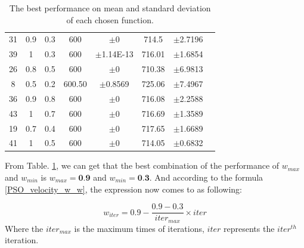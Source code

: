 \documentclass[letterpaper,12pt]{article}
\begin{document}
\begin{table}[!h]
\begin{tabular}{|c|c|c|c|c|c|c|c|c|}
31 & 0.9 & 0.3 & 600    & $\pm$0        & 714.5  & $\pm$2.7196 & \multicolumn{2}{c|}{}    \\ \cline{1-7}
39 & 1   & 0.3 & 600    & $\pm$1.14E-13 & 716.01 & $\pm$1.6854 & \multicolumn{2}{c|}{}    \\ \cline{1-7}
26 & 0.8 & 0.5 & 600    & $\pm$0        & 710.38 & $\pm$6.9813 & \multicolumn{2}{c|}{}    \\ \cline{1-7}
8  & 0.5 & 0.2 & 600.50 & $\pm$0.8569   & 725.06 & $\pm$7.4967 & \multicolumn{2}{c|}{}    \\ \cline{1-7}
36 & 0.9 & 0.8 & 600    & $\pm$0        & 716.08 & $\pm$2.2588 & \multicolumn{2}{c|}{}    \\ \cline{1-7}
43 & 1   & 0.7 & 600    & $\pm$0        & 716.69 & $\pm$1.3589 & \multicolumn{2}{c|}{}    \\ \cline{1-7}
19 & 0.7 & 0.4 & 600    & $\pm$0        & 717.65 & $\pm$1.6689 & \multicolumn{2}{c|}{}    \\ \cline{1-7}
41 & 1   & 0.5 & 600    & $\pm$0        & 714.05 & $\pm$0.6832 & \multicolumn{2}{c|}{}    \\ \hline
\end{tabular}
\caption {The best performance on mean and standard deviation of each chosen function.}
\label{tab:PSO_w}
\end{table}
\par From Table. \ref{tab:PSO_w}, we can get that the best combination of the performance of $w_{max}$ and $w_{min}$ is $w_{max}=\textbf{0.9}$ and $w_{min}=\textbf{0.3}$. And according to the formula \ref{PSO_velocity_w_w}, the expression now comes to as following:

\begin{equation}
w_{iter} = 0.9 - \dfrac{0.9 - 0.3}{iter_{max}}\times iter 
\label{PSO_velocity_w_w_numerical}
\end{equation}
Where the $iter_{max}$ is the maximum times of iterations, $iter$ represents the $iter^{th}$ iteration.
\end{document}
